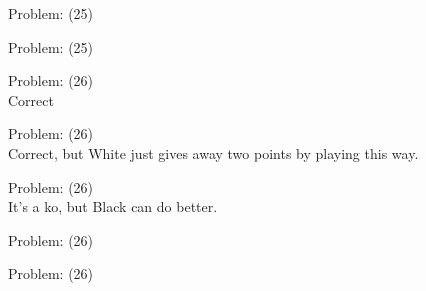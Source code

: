 \documentclass[11pt]{article}
\begin{document}
\begin{minipage}[t]{0.5\textwidth}
  {\centering
  
  Problem: (25)\\
  
  }
\end{minipage}
\begin{minipage}[t]{0.5\textwidth}
  {\centering
  
  Problem: (25)\\
  
  }
\end{minipage}
\begin{minipage}[t]{0.5\textwidth}
  {\centering
  
  Problem: (26)\\
  Correct\\
  }
\end{minipage}
\begin{minipage}[t]{0.5\textwidth}
  {\centering
  
  Problem: (26)\\
  Correct, but White just gives away two points by playing this way.\\
  }
\end{minipage}
\begin{minipage}[t]{0.5\textwidth}
  {\centering
  
  Problem: (26)\\
  It's a ko, but Black can do better.\\
  }
\end{minipage}
\begin{minipage}[t]{0.5\textwidth}
  {\centering
  
  Problem: (26)\\
  
  }
\end{minipage}
\begin{minipage}[t]{0.5\textwidth}
  {\centering
  
  Problem: (26)\\
  
  }
\end{minipage}
\end{document}
